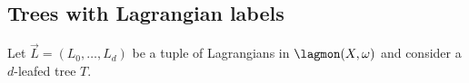 











\subsection{Trees with Lagrangian labels}\label{sectionlagtrees} Let $\vec{L}=(L_0,\ldots,L_d)$ be a tuple of Lagrangians in $\lagmon(X,\omega)$ and consider a $d$-leafed tree $T$. 

